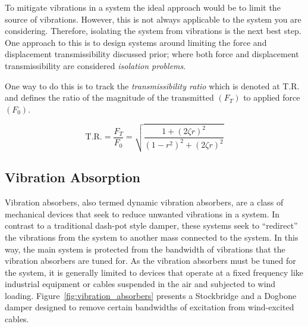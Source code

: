 \documentclass[12pt,letter]{article}
\begin{document}


To mitigate vibrations in a system the ideal approach would be to limit the source of vibrations. However, this is not always applicable to the system you are considering. Therefore, isolating the system from vibrations is the next best step. One approach to this is to design systems around limiting the force and displacement transmissibility discussed prior; where both force and displacement transmissibility are considered \emph{isolation problems}.

One way to do this is to track the \emph{transmissibility ratio} which is denoted at T.R. and defines the ratio of the magnitude of the transmitted $(F_T)$ to applied force $(F_0)$. 

\begin{equation}
	\text{T.R.} = \frac{F_T}{F_0} = \sqrt{\frac{1+(2 \zeta r )^2}{(1-r^2)^2+(2 \zeta r )^2}}
\end{equation}



\subsection{Vibration Absorption}

Vibration absorbers, also termed dynamic vibration absorbers, are a class of mechanical devices that seek to reduce unwanted vibrations in a system. In contrast to a traditional dash-pot style damper, these systems seek to ``redirect'' the vibrations from the system to another mass connected to the system. In this way, the main system is protected from the bandwidth of vibrations that the vibration absorbers are tuned for. As the vibration absorbers must be tuned for the system, it is generally limited to devices that operate at a fixed frequency like industrial equipment or cables suspended in the air and subjected to wind loading. Figure~\ref{fig:vibration_absorbers} presents a Stockbridge and a Dogbone damper designed to remove certain bandwidths of excitation from wind-excited cables.
\end{document}
